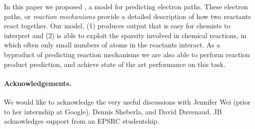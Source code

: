 
In this paper we proposed \ourModel, a model for predicting electron paths.
These electron paths, or {\em reaction mechanisms} provide a detailed description of how two reactants react together. 
Our model, (1) produces output that is easy for chemists to interpret and (2) is able to exploit the sparsity involved in chemical reactions, in which often only small numbers of atoms in the reactants interact.
As a byproduct of predicting reaction mechanisms we are also able to perform reaction product prediction,
 and achieve state of the art performance on this task.

 \paragraph{Acknowledgements.}
We would like to acknowledge the very useful discussions with Jennifer Wei (prior to her internship at Google), Dennis Sheberla, and David Duvenaud. 
JB acknowledges support from an EPSRC studentship.
